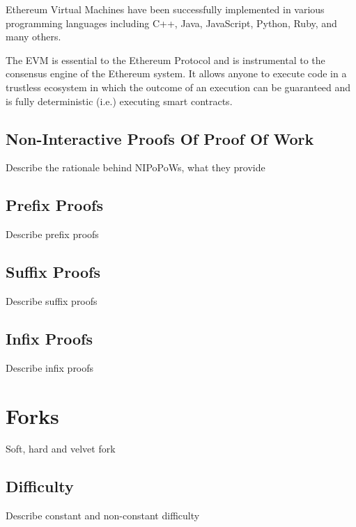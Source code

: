Ethereum Virtual Machines have been successfully implemented in
various programming languages including C++, Java, JavaScript, Python,
Ruby, and many others.

The EVM is essential to the Ethereum Protocol and is instrumental to
the consensus engine of the Ethereum system. It allows anyone to
execute code in a trustless ecosystem in which the outcome of an
execution can be guaranteed and is fully deterministic (i.e.)
executing smart contracts.

\subsection{Non-Interactive Proofs Of Proof Of Work}

Describe the rationale behind NIPoPoWs, what they provide

\subsection{Prefix Proofs}

Describe prefix proofs

\subsection{Suffix Proofs}

Describe suffix proofs

\subsection{Infix Proofs}

Describe infix proofs

\section{Forks}

Soft, hard and velvet fork

\subsection{Difficulty}

Describe constant and non-constant difficulty
